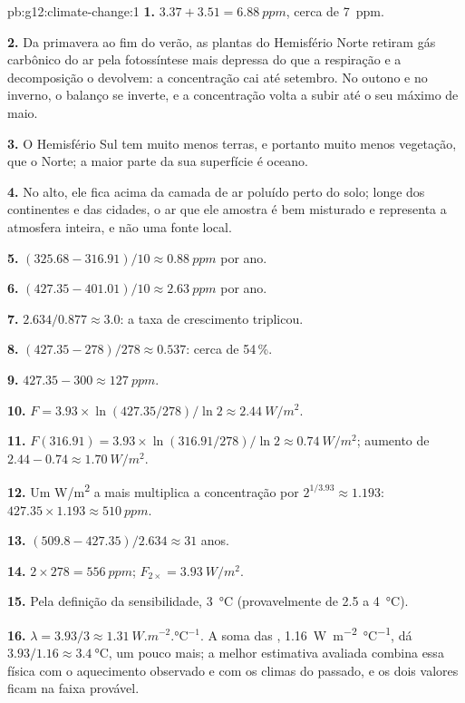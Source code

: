 \begin{solution}{pb:g12:climate-change:1}
\textbf{1.} $3.37 + 3.51 = \qty{6.88}{ppm}$, cerca de \qty{7}{ppm}.

\textbf{2.} Da primavera ao fim do verão, as plantas do Hemisfério Norte
retiram gás carbônico do ar pela fotossíntese mais depressa do que a
respiração e a decomposição o devolvem: a concentração cai até setembro. No
outono e no inverno, o balanço se inverte, e a concentração volta a subir
até o seu máximo de maio.

\textbf{3.} O Hemisfério Sul tem muito menos terras, e portanto muito menos
vegetação, que o Norte; a maior parte da sua superfície é oceano.

\textbf{4.} No alto, ele fica acima da camada de ar poluído perto do solo;
longe dos continentes e das cidades, o ar que ele amostra é bem misturado e
representa a atmosfera inteira, e não uma fonte local.

\textbf{5.} $(325.68 - 316.91)/10 \approx \qty{0.88}{ppm}$ por ano.

\textbf{6.} $(427.35 - 401.01)/10 \approx \qty{2.63}{ppm}$ por ano.

\textbf{7.} $2.634/0.877 \approx 3.0$: a taxa de crescimento triplicou.

\textbf{8.} $(427.35 - 278)/278 \approx 0.537$: cerca de 54\,\%.

\textbf{9.} $427.35 - 300 \approx \qty{127}{ppm}$.

\textbf{10.} $F = 3.93 \times \ln(427.35/278)/\ln 2 \approx
\qty{2.44}{W/m^2}$.

\textbf{11.} $F(316.91) = 3.93 \times \ln(316.91/278)/\ln 2 \approx
\qty{0.74}{W/m^2}$; aumento de $2.44 - 0.74 \approx \qty{1.70}{W/m^2}$.

\textbf{12.} Um \unit{W/m^2} a mais multiplica a concentração por
$2^{1/3.93} \approx 1.193$: $427.35 \times 1.193 \approx \qty{510}{ppm}$.

\textbf{13.} $(509.8 - 427.35)/2.634 \approx 31$ anos.

\textbf{14.} $2 \times 278 = \qty{556}{ppm}$;  $F_{2\times} =
\qty{3.93}{W/m^2}$.

\textbf{15.} Pela definição da sensibilidade, \qty{3}{\degreeCelsius}
(provavelmente de 2.5 a \qty{4}{\degreeCelsius}).

\textbf{16.} $\lambda = 3.93/3 \approx \qty{1.31}{W.m^{-2}.\degreeCelsius^{-1}}$.
A soma das , \qty{1.16}{W.m^{-2}.\degreeCelsius^{-1}}, dá
$3.93/1.16 \approx \qty{3.4}{\degreeCelsius}$, um pouco mais; a melhor
estimativa avaliada combina essa física com o aquecimento observado e com os
climas do passado, e os dois valores ficam na faixa provável.


\end{solution}
